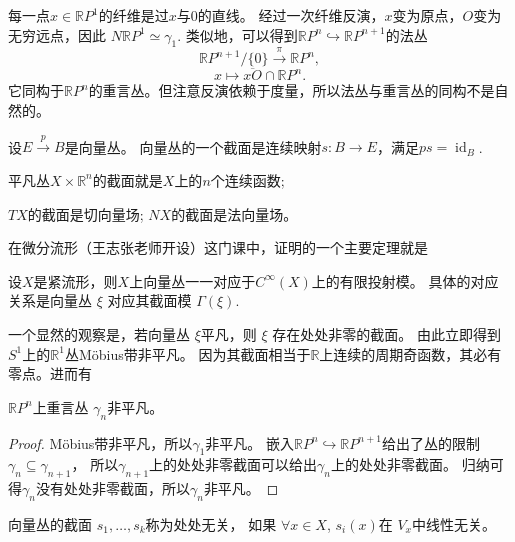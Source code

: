     每一点$x\in \mathbb{R}P^1$的纤维是过$x$与$0$的直线。
    经过一次纤维反演，$x$变为原点，$O$变为无穷远点，因此
    $N\mathbb{R}P^1\simeq \gamma_1$.
    类似地，可以得到$\mathbb{R}P^n\hookrightarrow\mathbb{R}P^{n+1}$的法丛
    $$
        \mathbb{R}P^{n+1}/\{0\}\stackrel{\pi}{\rightarrow}\mathbb{R}P^n,
    $$
    $$
        x\mapsto \overline{xO}\cap \mathbb{R}P^n.
    $$
    它同构于$\mathbb{R}P^n$的重言丛。但注意反演依赖于度量，所以法丛与重言丛的同构不是自然的。

    \begin{definition}[向量丛的截面]
        设$E\stackrel{p}{\rightarrow}B$是向量丛。
        向量丛的一个截面是连续映射$s:B\rightarrow E$，满足$ps=\operatorname{id}_B$.
    \end{definition}

    \begin{example}
        平凡丛$X\times \mathbb{R}^n$的截面就是$X$上的$n$个连续函数;

        \qquad $TX$的截面是切向量场; $NX$的截面是法向量场。
    \end{example}

    \qquad   在微分流形（王志张老师开设）这门课中，证明的一个主要定理就是
    \begin{theorem}
        设$X$是紧流形，则$X$上向量丛一一对应于$C^{\infty}(X)$上的有限投射模。
        具体的对应关系是向量丛 $\xi$ 对应其截面模 $\Gamma(\xi)$.
    \end{theorem}

    \qquad 一个显然的观察是，若向量丛 $\xi$平凡，则 $\xi$ 存在处处非零的截面。
    由此立即得到$S^1$上的$\mathbb{R}^1$丛Möbius带非平凡。
    因为其截面相当于$\mathbb{R}$上连续的周期奇函数，其必有零点。进而有
    \begin{proposition}
        $\mathbb{R}P^n$上重言丛 $\gamma_n$非平凡。
    \end{proposition}
    \begin{proof}
        Möbius带非平凡，所以$\gamma_1$非平凡。
        嵌入$\mathbb{R}P^n\hookrightarrow\mathbb{R}P^{n+1}$给出了丛的限制
        $\gamma_n\subseteq \gamma_{n+1}$，
        所以$\gamma_{n+1}$上的处处非零截面可以给出$\gamma_n$上的处处非零截面。
        归纳可得$\gamma_{n}$没有处处非零截面，所以$\gamma_{n}$非平凡。
    \end{proof}
    \begin{definition}
        向量丛的截面 $s_1,\ldots,s_k$称为处处无关，
        如果 $\forall x\in X$, $s_i(x)$在 $V_x$中线性无关。
    \end{definition}


